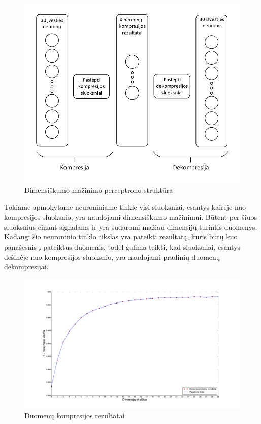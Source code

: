 \documentclass{VUMIFPSbakalaurinis}
\begin{document}
\begin{figure}
	\includegraphics[scale=0.75]{diagrams/compression_perceptron}
	\caption{Dimensiškumo mažinimo perceptrono struktūra}
	\label{fig:compression_perceptron}
\end{figure}

Tokiame apmokytame neuroniniame tinkle visi sluoksniai, esantys kairėje nuo kompresijos sluoksnio, yra naudojami dimensiškumo mažinimui.
Būtent per šiuos sluoksnius einant signalams ir yra sudaromi mažiau dimensijų turintis duomenys.
Kadangi šio neuroninio tinklo tikslas yra pateikti rezultatą, kuris būtų kuo panašesnis į pateiktus duomenis, todėl galima teikti, kad sluoksniai, esantys dešinėje nuo kompresijos sluoksnio, yra naudojami pradinių duomenų dekompresijai.

\begin{figure}
	\includegraphics[scale=0.25]{pics/compression_dimensions}
	\caption{Duomenų kompresijos rezultatai}
	\label{fig:compression_dimensions}
\end{figure}
\end{document}
